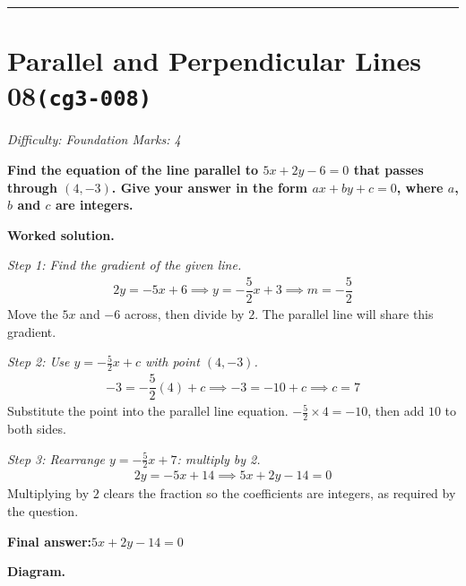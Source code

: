 \documentclass[11pt]{article}
\newcommand{\question}[1]{\par\medskip\noindent\textbf{#1}\par}
\begin{document}
\medskip\hrule

\section*{Parallel and Perpendicular Lines 08\quad\small\texttt{(cg3-008)}}
\textit{Difficulty: Foundation \quad\textbar\quad Marks: 4}

\question{Find the equation of the line parallel to \( 5x + 2y - 6 = 0 \) that passes through \( (4, -3) \). Give your answer in the form \( ax + by + c = 0 \), where \( a \), \( b \) and \( c \) are integers.}

\textbf{Worked solution.}

\textit{Step 1: Find the gradient of the given line.}
\[\begin{gathered}
2y = -5x + 6 \implies y = -\dfrac{5}{2}x + 3 \implies m = -\dfrac{5}{2}
\end{gathered}\]
Move the \( 5x \) and \( -6 \) across, then divide by \( 2 \). The parallel line will share this gradient.

\textit{Step 2: Use \( y = -\frac{5}{2}x + c \) with point \( (4, -3) \).}
\[\begin{gathered}
-3 = -\dfrac{5}{2}(4) + c \implies -3 = -10 + c \implies c = 7
\end{gathered}\]
Substitute the point into the parallel line equation. \( -\tfrac{5}{2} \times 4 = -10 \), then add \( 10 \) to both sides.

\textit{Step 3: Rearrange \( y = -\frac{5}{2}x + 7 \): multiply by 2.}
\[\begin{gathered}
2y = -5x + 14 \implies 5x + 2y - 14 = 0
\end{gathered}\]
Multiplying by \( 2 \) clears the fraction so the coefficients are integers, as required by the question.

\begin{answerbox}
\textbf{Final answer:}\quad \(\displaystyle 5x + 2y - 14 = 0\)
\end{answerbox}
\textbf{Diagram.}
\end{document}
